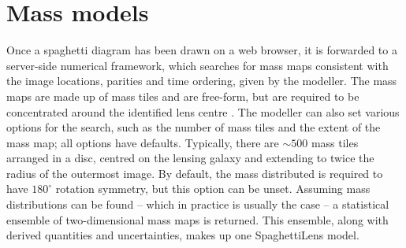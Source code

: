 
\section{Mass models}\label{sec:massmodels}



Once a spaghetti diagram has been drawn on a web browser, it is
forwarded to a server-side numerical framework, which searches for
mass maps consistent with the image locations, parities and time
ordering, given by the modeller.  The mass maps are made up of mass
tiles and are free-form, but are required to be concentrated around
the identified lens centre \citep[see][for the precise formulation of
  the search problem]{2014MNRAS.445.2181C}.  The modeller can also set
various options for the search, such as the number of mass tiles and
the extent of the mass map; all options have defaults.  Typically,
there are $\sim500$ mass tiles arranged in a disc, centred on the
lensing galaxy and extending to twice the radius of the outermost
image.  By default, the mass distributed is required to have
$180^\circ$ rotation symmetry, but this option can be unset.  Assuming
mass distributions can be found -- which in practice is usually the
case -- a statistical ensemble of two-dimensional mass maps is
returned.  This ensemble, along with derived quantities and
uncertainties, makes up one SpaghettiLens model.

